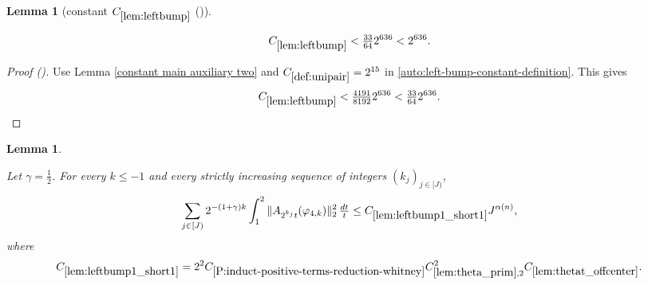 \documentclass[12pt,reqno]{amsart}
\newcommand{\auto}{{({\tiny\faCar})}}
\theoremstyle{plain}
\newtheorem{lemma}[theorem]{Lemma}
\numberwithin{equation}{section}
\theoremstyle{remark}
\newcommand{\uses}[1]{}
\newcommand{\usesdefs}[1]{}
\newcommand{\leanok}{}
\newcommand{\lean}[1]{}
\begin{document}
\begin{lemma}[constant $C_{\ref{lem:leftbump}}$ \auto]\label{constant left bump}\uses{constant main auxiliary two,lem:leftbump}\usesdefs{def:unipair}
\lean{Auto.constantLeftBump}
\leanok
\begin{equation}\label{constant left bump bound}
C_{\ref{lem:leftbump}}<\tfrac{33}{64}2^{636}<2^{636}.
\end{equation}
\end{lemma}
\begin{proof}[Proof \auto]
Use Lemma \ref{constant main auxiliary two} and $C_{\ref{def:unipair}}=2^{15}$ in \eqref{auto:left-bump-constant-definition}. This gives
\[
C_{\ref{lem:leftbump}}
<\tfrac{4191}{8192}2^{636}
<\tfrac{33}{64}2^{636}.
\]
\end{proof}

\begin{lemma}\label{lem:leftbump1_short1}\uses{Extension of sequences,A to Lambda,lem:theta_prim,lem:thetat_offcenter,P:induct-positive-terms-reduction-whitney,lem:int_fct,lem:phi4_supp}\usesdefs{A_def,bracket bump,normalized function tuples,auto:prism-form-definition,multiplicatively spaced monotone sequences,defn:window based bump functions}
\lean{Auto.leftBumpOneShortOne}
\leanok
Let $\gamma=\frac12$. For every $k\le-1$ and every strictly increasing sequence of integers $(k_j)_{j\in[J)}$,
\begin{equation}\label{auto:left-bump-one-short-one-bound}
\sum_{j\in[J)}2^{-(1+\gamma)k}\int_1^2
\|A_{2^{k_j}t}(\varphi_{4,k})\|_2^2\,\tfrac{dt}{t}
\le C_{\ref{lem:leftbump1_short1}}J^{\alpha(n)},
\end{equation}
where
\begin{equation}\label{auto:left-bump-one-short-one-constant-definition}
C_{\ref{lem:leftbump1_short1}}
=2^2C_{\ref{P:induct-positive-terms-reduction-whitney}}
C_{\ref{lem:theta_prim},2}^2C_{\ref{lem:thetat_offcenter}}.
\end{equation}
\end{lemma}
\end{document}
